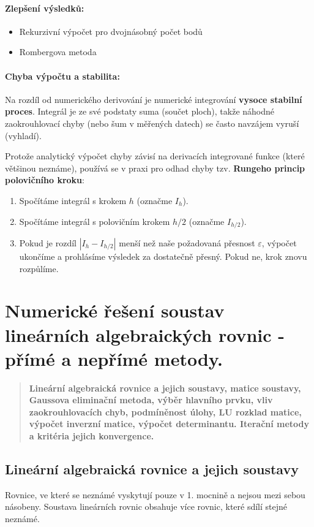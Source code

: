

\paragraph*{Zlepšení výsledků:}
\begin{itemize}
    \item Rekurzivní výpočet pro dvojnásobný počet bodů
    \item Rombergova metoda
\end{itemize} 

\paragraph*{Chyba výpočtu a stabilita:}
Na rozdíl od numerického derivování je numerické integrování \textbf{vysoce stabilní proces}. Integrál je ze své podstaty suma (součet ploch), takže náhodné zaokrouhlovací chyby (nebo šum v měřených datech) se často navzájem vyruší (vyhladí).

Protože analytický výpočet chyby závisí na derivacích integrované funkce (které většinou neznáme), používá se v praxi pro odhad chyby tzv. \textbf{Rungeho princip polovičního kroku}:
\begin{enumerate}
    \item Spočítáme integrál s krokem $h$ (označme $I_h$).
    \item Spočítáme integrál s polovičním krokem $h/2$ (označme $I_{h/2}$).
    \item Pokud je rozdíl $|I_{h} - I_{h/2}|$ menší než naše požadovaná přesnost $\varepsilon$, výpočet ukončíme a prohlásíme výsledek za dostatečně přesný. Pokud ne, krok znovu rozpůlíme.
\end{enumerate}

\newpage

\section{Numerické řešení soustav lineárních algebraických rovnic - přímé a nepřímé metody.}
\begin{quote}
    \textbf{Lineární algebraická rovnice a jejich soustavy, matice soustavy, Gaussova eliminační metoda, výběr hlavního prvku, vliv zaokrouhlovacích chyb, podmíněnost úlohy, LU rozklad matice, výpočet inverzní matice, výpočet determinantu. Iterační metody a kritéria jejich konvergence.}
\end{quote}

\subsection{Lineární algebraická rovnice a jejich soustavy}
Rovnice, ve které se neznámé vyskytují pouze v 1. mocnině a nejsou mezi sebou násobeny.
Soustava lineárních rovnic obsahuje více rovnic, které sdílí stejné neznámé.
